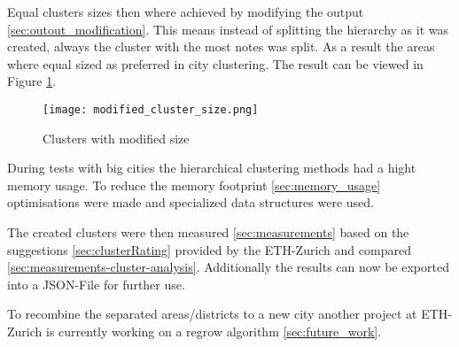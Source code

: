 Equal clusters sizes then where achieved by modifying the output \ref{sec:outout_modification}. This means instead of splitting the hierarchy as it was created, always the cluster with the most notes was split. As a result the areas where equal sized as preferred in city clustering. The result can be viewed in Figure  \ref{fig:cluster_with_mod_sizes}.

\begin{figure}[ht]
    \centering
    \begin{mdframed}[style=mdthight, userdefinedwidth=0.4\linewidth, align=center]
        \texttt{[image: modified\_cluster\_size.png]}
    \end{mdframed}
    \caption{Clusters with modified size}
    \label{fig:cluster_with_mod_sizes}
\end{figure}

During tests with big cities the hierarchical clustering methods had a hight memory usage. To reduce the memory footprint \ref{sec:memory_usage} optimisations were made and specialized data structures were used.

The created clusters were then measured \ref{sec:measurements} based on the suggestions \ref{sec:clusterRating} provided by the ETH-Zurich and compared \ref{sec:measurements-cluster-analysis}. Additionally the results can now be exported into a JSON-File for further use.

To recombine the separated areas/districts to a new city another project at ETH-Zurich is currently working on a regrow algorithm \ref{sec:future_work}. 